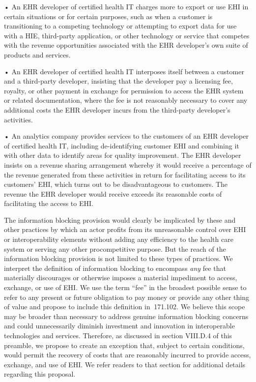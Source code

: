 \documentclass[twoside,11pt]{article}
\begin{document}
          • An EHR developer of certified health IT charges more to export or use EHI in certain situations or for certain purposes, such as when a customer is transitioning to a competing technology or attempting to export data for use with a HIE, third-party application, or other technology or service that competes with the revenue opportunities associated with the EHR developer's own suite of products and services.


          • An EHR developer of certified health IT interposes itself between a customer and a third-party developer, insisting that the developer pay a licensing fee, royalty, or other payment in exchange for permission to access the EHR system or related documentation, where the fee is not reasonably necessary to cover any additional costs the EHR developer incurs from the third-party developer's activities.


          • An analytics company provides services to the customers of an EHR developer of certified health IT, including de-identifying customer EHI and combining it with other data to identify areas for quality improvement. The EHR developer insists on a revenue sharing arrangement whereby it would receive a percentage of the revenue generated from these activities in return for facilitating access to its customers' EHI, which turns out to be disadvantageous to customers. The revenue the EHR developer would receive exceeds its reasonable costs of facilitating the access to EHI.



          The information blocking provision would clearly be implicated by these and other practices by which an actor profits from its unreasonable control over EHI or interoperability elements without adding any efficiency to the health care system or serving any other procompetitive purpose. But the reach of the information blocking provision is not limited to these types of practices. We interpret the definition of information blocking to encompass \emph{any} fee that materially discourages or otherwise imposes a material impediment to access, exchange, or use of EHI. We use the term “fee” in the broadest possible sense to refer to any present or future obligation to pay money or provide any other thing of value and propose to include this definition in \textsection{} 171.102. We believe this scope may be broader than necessary to address genuine information blocking concerns and could unnecessarily diminish investment and innovation in interoperable technologies and services. Therefore, as discussed in section VIII.D.4 of this preamble, we propose to create an exception that, subject to certain conditions, would permit the recovery of costs that are reasonably incurred to provide access, exchange, and use of EHI. We refer readers to that section for additional details regarding this proposal.
\end{document}
